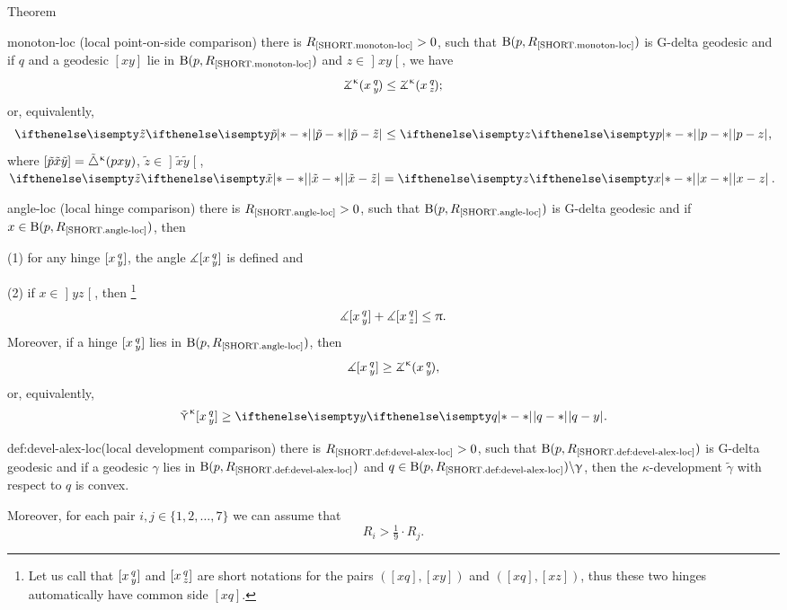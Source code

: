 \begin{thm}{Theorem}
\begin{subthmN}{monoton-loc} (local point-on-side comparison) 
there is $R_{\hbox{\rm\scriptsize\ref{SHORT.monoton-loc}}}>0$, 
such that $\mathrm{B}{}(p,R_{\hbox{\rm\scriptsize\ref{SHORT.monoton-loc}}})$ is G-delta geodesic and if $q$ and a geodesic $[x y]$ lie in $\mathrm{B}{}(p,R_{\hbox{\rm\scriptsize\ref{SHORT.monoton-loc}}})$ 
and $z\in \mathopen{]}x y\mathclose{[}$, we have
\[\angk\kappa x q y
\le\angk\kappa x q z;\]
or, equivalently, 
\[\dist{\tilde p}{\tilde z}{}\le \dist{p}{z}{},\]
where $[{\tilde p}{\tilde x}{\tilde y}]={\tilde\triangle}^{\upkappa}(p x y)$, $\tilde z\in\mathopen{]} \tilde x\tilde y\mathclose{[}$, $\dist{\tilde x}{\tilde z}{}=\dist{x}{z}{}$.
\end{subthmN}

\begin{subthmN}{angle-loc} (local hinge comparison) 
there is $R_{\hbox{\rm\scriptsize\ref{SHORT.angle-loc}}}>0$, such that $\mathrm{B}{}(p,R_{\hbox{\rm\scriptsize\ref{SHORT.angle-loc}}})$ is G-delta geodesic and if $x\in \oBall(p,R_{\hbox{\rm\scriptsize\ref{SHORT.angle-loc}}})$, then 

(1) for any hinge $[x\,{}^{q}_{y}]$, the angle 
$\measuredangle[x\,{}^{q}_{y}]$ is defined and

 (2) if $x\in \mathopen{]}y z\mathclose{[}$, then%
\footnote{Let us call that $[x\,{}^{q}_{y}]$ and $[x\,{}^{q}_{z}]$  are short notations for the pairs $([x q],[x y])$ and $([x q],[x z])$, 
thus these two hinges automatically have common side $[x q]$.}
\[\mangle\hinge x q y+ \mangle\hinge x q z\le\pi.\]
Moreover, if a hinge $[x\,{}^{q}_{y}]$ lies in $\mathrm{B}{}(p,R_{\hbox{\rm\scriptsize\ref{SHORT.angle-loc}}})$, then 
\[\mangle\hinge x q y
\ge\angk\kappa x q y,\]
or, equivalently,
\[\side\kappa \hinge x q y\ge\dist{q}{ y}{}.\]
\end{subthmN}


\begin{subthmN}{def:devel-alex-loc}(local development comparison) 
there is $R_{\hbox{\rm\scriptsize\ref{SHORT.def:devel-alex-loc}}}>0$, 
such that $\mathrm{B}{}(p,R_{\hbox{\rm\scriptsize\ref{SHORT.def:devel-alex-loc}}})$ 
is G-delta geodesic and if a geodesic $\gamma$ lies in $\mathrm{B}{}(p,R_{\hbox{\rm\scriptsize\ref{SHORT.def:devel-alex-loc}}})$ and $q\in 
\oBall(p,R_{\hbox{\rm\scriptsize\ref{SHORT.def:devel-alex-loc}}})
\backslash \gamma$, then the $\kappa$-development $\tilde \gamma$ with respect to $q$ is convex.
\end{subthmN}
Moreover, for each pair $i,j\in \{1,2,\dots,7\}$ we can assume that 
\[R_i>\tfrac{1}{9}\cdot R_j.\]
\end{thm}

